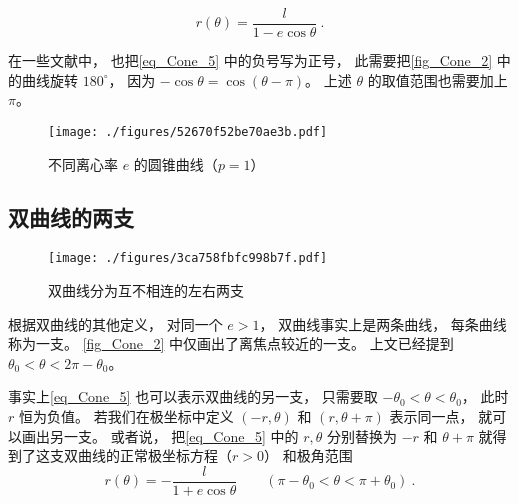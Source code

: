 \begin{equation}\label{eq_Cone_5}
r(\theta)  = \frac{l}{1 - e\cos \theta }~.
\end{equation}

在一些文献中， 也把\autoref{eq_Cone_5} 中的负号写为正号， 此需要把\autoref{fig_Cone_2} 中的曲线旋转 $180^\circ$， 因为 $-\cos\theta = \cos(\theta - \pi)$。 上述 $\theta$ 的取值范围也需要加上 $\pi$。


\begin{figure}[ht]
\centering
\texttt{[image: ./figures/52670f52be70ae3b.pdf]}
\caption{不同离心率 $e$ 的圆锥曲线（$p = 1$）} \label{fig_Cone_2}
\end{figure}








\subsection{双曲线的两支}
\begin{figure}[ht]
\centering
\texttt{[image: ./figures/3ca758fbfc998b7f.pdf]}
\caption{双曲线分为互不相连的左右两支} \label{fig_Cone_3}
\end{figure}
根据双曲线的其他定义， 对同一个 $e>1$， 双曲线事实上是两条曲线， 每条曲线称为一支。 \autoref{fig_Cone_2} 中仅画出了离焦点较近的一支。 上文已经提到 $\theta_0< \theta < 2\pi-\theta_0$。

事实上\autoref{eq_Cone_5} 也可以表示双曲线的另一支， 只需要取 $-\theta_0< \theta < \theta_0$， 此时 $r$ 恒为负值。 若我们在极坐标中定义 $(-r, \theta)$ 和 $(r, \theta + \pi)$ 表示同一点， 就可以画出另一支。 或者说， 把\autoref{eq_Cone_5} 中的  $r,\theta$ 分别替换为 $-r$ 和 $\theta+\pi$ 就得到了这支双曲线的正常极坐标方程（$r > 0$） 和极角范围
\begin{equation}\label{eq_Cone_6}
r(\theta) = -\frac{l}{1 + e\cos\theta} \qquad (\pi - \theta_0<\theta < \pi + \theta_0)~.
\end{equation}


